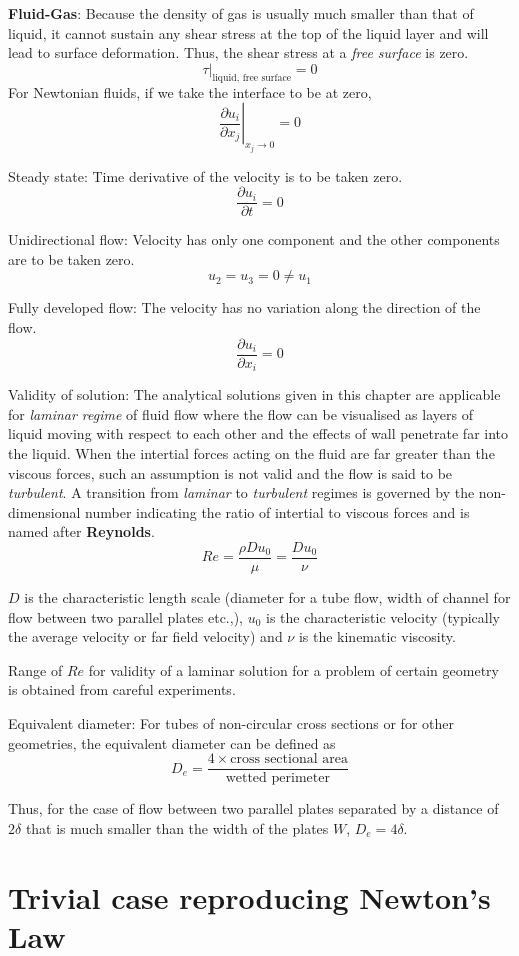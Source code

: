 {\bf Fluid-Gas}: Because the density of gas is usually much smaller than that of liquid, it cannot sustain any shear stress at the top of the liquid layer and will lead to surface deformation. Thus, the shear stress at a \textit{free surface} is zero.
$$\tau|_{\text{liquid, free surface}} = 0$$
For Newtonian fluids, if we take the interface to be at zero,
$$\left.\frac{\partial u_i}{\partial x_j}\right|_{x_j \rightarrow 0} = 0$$

Steady state: Time derivative of the velocity is to be taken zero.
$$\frac{\partial u_i}{\partial t} = 0$$

Unidirectional flow: Velocity has only one component and the other components are to be taken zero.
$$u_2 = u_3 = 0 \ne u_1$$

Fully developed flow: The velocity has no variation along the direction of the flow.
$$\frac{\partial u_i}{\partial x_i} = 0$$

Validity of solution: The analytical solutions given in this chapter are applicable for \textit{laminar regime} of fluid flow where the flow can be visualised as layers of liquid moving with respect to each other and the effects of wall penetrate far into the liquid. When the intertial forces acting on the fluid are far greater than the viscous forces, such an assumption is not valid and the flow is said to be \textit{turbulent}. A transition from \textit{laminar} to \textit{turbulent} regimes is governed by the non-dimensional number indicating the ratio of intertial to viscous forces and is named after \textbf{Reynolds}.
$$Re = \frac{\rho D u_0}{\mu} = \frac{D u_0}{\nu}$$

$D$ is the characteristic length scale (diameter for a tube flow, width of channel for flow between two parallel plates etc.,), $u_0$ is the characteristic velocity (typically the average velocity or far field velocity) and $\nu$ is the kinematic viscosity.

Range of $Re$ for validity of a laminar solution for a problem of certain geometry is obtained from careful experiments.


Equivalent diameter: For tubes of non-circular cross sections or for other geometries, the equivalent diameter can be defined as 
$$ D_e = \frac{4 \times \text{cross sectional area}}{\text{wetted perimeter}}$$

Thus, for the case of flow between two parallel plates separated by a distance of $2\delta$ that is much smaller than the width of the plates $W$, $D_e = 4\delta$.

\section{Trivial case reproducing Newton's Law}

